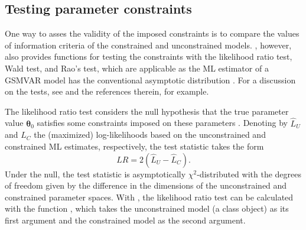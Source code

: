 \documentclass[nojss]{jss}
\begin{document}
\subsection{Testing parameter constraints}\label{sec:testconst}

One way to asses the validity of the imposed constraints is to compare the values of information criteria of the constrained and unconstrained models. , however, also provides functions for testing the constraints with the likelihood ratio test, Wald test, and Rao's test, which are applicable as the ML estimator of a GSMVAR model has the conventional asymptotic distribution \cite[as long as the model is correctly specified and one is willing to assume the validity of the required unverified assumptions; see][Theorem 3, and \cite{Kalliovirta+Meitz+Saikkonen:2016}, Theorem 3]{Virolainen2:2021}. For a discussion on the tests, see \citet{Buse:1982} and the references therein, for example.

The likelihood ratio test considers the null hypothesis that the true parameter value $\boldsymbol{\theta}_0$ satisfies some constraints imposed on these parameters \cite[such that the constrained parameter space is a subset of the parameter space, which is presented in][Assumption 2 for the GSMVAR models]{Virolainen2:2021}. Denoting by $\hat{L}_U$ and $\hat{L}_C$ the (maximized) log-likelihoods based on the unconstrained and constrained ML estimates, respectively, the test statistic takes the form
\begin{equation}
LR=2(\hat{L}_U - \hat{L}_C).
\end{equation}
Under the null, the test statistic is asymptotically $\chi^2$-distributed with the degrees of freedom given by the difference in the dimensions of the unconstrained and constrained parameter spaces. With , the likelihood ratio test can be calculated with the function , which takes the unconstrained model (a class  object) as its first argument and the constrained model as the second argument.
\end{document}
